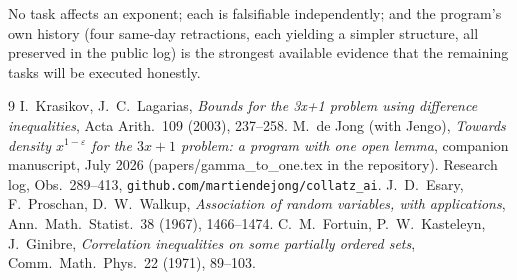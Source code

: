 \documentclass[11pt]{article}
\theoremstyle{definition}
\begin{document}
No task affects an exponent; each is falsifiable independently; and the
program's own history (four same-day retractions, each yielding a simpler
structure, all preserved in the public log) is the strongest available evidence
that the remaining tasks will be executed honestly.

\begin{thebibliography}{9}
 I.~Krasikov, J.~C.~Lagarias, \emph{Bounds for the 3x+1 problem
using difference inequalities}, Acta Arith.\ 109 (2003), 237--258.
 M.~de Jong (with Jengo), \emph{Towards density $x^{1-\varepsilon}$
for the $3x+1$ problem: a program with one open lemma}, companion manuscript,
July 2026 (papers/gamma\_to\_one.tex in the repository).
 Research log, Obs.\ 289--413,
\texttt{github.com/martiendejong/collatz\_ai}.
 J.~D.~Esary, F.~Proschan, D.~W.~Walkup, \emph{Association
of random variables, with applications}, Ann.\ Math.\ Statist.\ 38
(1967), 1466--1474.
 C.~M.~Fortuin, P.~W.~Kasteleyn, J.~Ginibre,
\emph{Correlation inequalities on some partially ordered sets},
Comm.\ Math.\ Phys.\ 22 (1971), 89--103.
\end{thebibliography}
\end{document}
